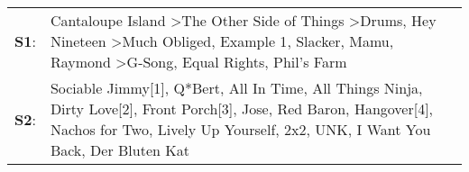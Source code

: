 \begin{supertabular}{p{0.03\textwidth}p{0.92\textwidth}}
 \textbf{S1}:  &                                                                                   Cantaloupe Island\textsuperscript{} \textgreater \enspace The Other Side of Things\textsuperscript{} \textgreater \enspace Drums\textsuperscript{}, \enspace Hey Nineteen\textsuperscript{} \textgreater \enspace Much Obliged\textsuperscript{}, \enspace Example 1\textsuperscript{}, \enspace Slacker\textsuperscript{}, \enspace Mamu\textsuperscript{}, \enspace Raymond\textsuperscript{} \textgreater \enspace G-Song\textsuperscript{}, \enspace Equal Rights\textsuperscript{}, \enspace Phil's Farm\textsuperscript{}  \enspace  \\
 \textbf{S2}:  &  Sociable Jimmy[1]\textsuperscript{}, \enspace Q*Bert\textsuperscript{}, \enspace All In Time\textsuperscript{}, \enspace All Things Ninja\textsuperscript{}, \enspace Dirty Love[2]\textsuperscript{}, \enspace Front Porch[3]\textsuperscript{}, \enspace Jose\textsuperscript{}, \enspace Red Baron\textsuperscript{}, \enspace Hangover[4]\textsuperscript{}, \enspace Nachos for Two\textsuperscript{}, \enspace Lively Up Yourself\textsuperscript{}, \enspace 2x2\textsuperscript{}, \enspace UNK\textsuperscript{}, \enspace I Want You Back\textsuperscript{}, \enspace Der Bluten Kat\textsuperscript{}  \enspace  \\
\end{supertabular}
